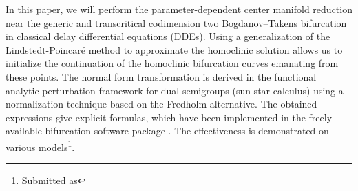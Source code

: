 In this paper, we will perform the parameter-dependent center manifold reduction
near the generic and transcritical codimension two Bogdanov--Takens bifurcation
in classical delay differential equations (DDEs). Using a generalization of the
Lindstedt-Poincar\'e method to approximate the homoclinic solution allows us to
initialize the continuation of the homoclinic bifurcation curves emanating from
these points. The normal form transformation is derived in the functional
analytic perturbation framework for dual semigroups (sun-star calculus) using a
normalization technique based on the Fredholm alternative. The obtained
expressions give explicit formulas, which have been implemented in the freely
available bifurcation software package \DDEBIFTOOL. The effectiveness is
demonstrated on various models\ifthesis\footnote{Submitted as}\fi.
